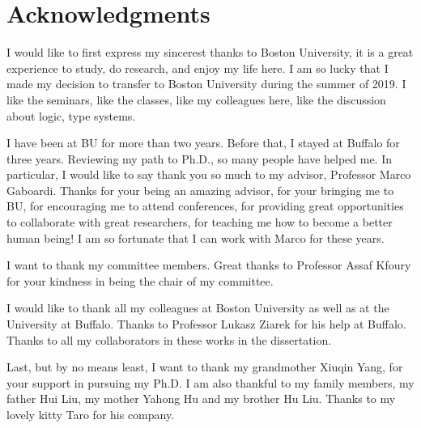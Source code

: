 \section*{Acknowledgments}

I would like to first express my sincerest thanks to Boston University, 
it is a great experience to study, do research, and enjoy my life here. 
I am so lucky that I made my decision to transfer to Boston University during the summer of 2019. 
I like the seminars, like the classes, like my colleagues here, like the discussion about logic, type systems. 

I have been at BU for more than two years. 
Before that, I stayed at Buffalo for three years. 
Reviewing my path to Ph.D., so many people have helped me. 
In particular, I would like to say thank you so much to my advisor, Professor Marco Gaboardi. 
Thanks for your being an amazing advisor, for your bringing me to BU, for encouraging me to attend conferences, for providing great opportunities to collaborate with great researchers, for teaching me how to become a better human being! 
I am so fortunate that I can work with Marco for these years.

I want to thank my committee members. 
Great thanks to Professor Assaf Kfoury for your kindness in being the chair of my committee.

I would like to thank all my colleagues at Boston University as well as at the University at Buffalo. 
Thanks to Professor Lukasz Ziarek for his help at Buffalo. 
Thanks to all my collaborators in these works in the dissertation.

Last, but by no means least, I want to thank my grandmother Xiuqin Yang, for your support in pursuing my Ph.D. 
I am also thankful to my family members, my father Hui Liu, my mother Yahong Hu and my brother Hu Liu.  
Thanks to my lovely kitty Taro for his company. 

